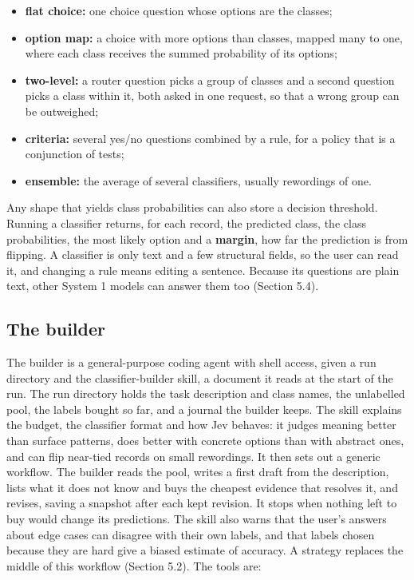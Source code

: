 \documentclass[11pt]{article}
\begin{document}
\begin{itemize}
\item \textbf{flat choice:} one choice question whose options are the classes;
\item \textbf{option map:} a choice with more options than classes, mapped many to one, where each class receives the summed probability of its options;
\item \textbf{two-level:} a router question picks a group of classes and a second question picks a class within it, both asked in one request, so that a wrong group can be outweighed;
\item \textbf{criteria:} several yes/no questions combined by a rule, for a policy that is a conjunction of tests;
\item \textbf{ensemble:} the average of several classifiers, usually rewordings of one.
\end{itemize}

Any shape that yields class probabilities can also store a decision threshold. Running a classifier returns, for each record, the predicted class, the class probabilities, the most likely option and a \textbf{margin}, how far the prediction is from flipping. A classifier is only text and a few structural fields, so the user can read it, and changing a rule means editing a sentence. Because its questions are plain text, other System 1 models can answer them too (Section 5.4).

\subsection{The builder}

The builder is a general-purpose coding agent with shell access, given a run directory and the classifier-builder skill, a document it reads at the start of the run. The run directory holds the task description and class names, the unlabelled pool, the labels bought so far, and a journal the builder keeps. The skill explains the budget, the classifier format and how Jev behaves: it judges meaning better than surface patterns, does better with concrete options than with abstract ones, and can flip near-tied records on small rewordings. It then sets out a generic workflow. The builder reads the pool, writes a first draft from the description, lists what it does not know and buys the cheapest evidence that resolves it, and revises, saving a snapshot after each kept revision. It stops when nothing left to buy would change its predictions. The skill also warns that the user's answers about edge cases can disagree with their own labels, and that labels chosen because they are hard give a biased estimate of accuracy. A strategy replaces the middle of this workflow (Section 5.2). The tools are:
\end{document}

